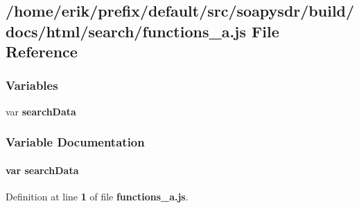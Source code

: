 \subsection{/home/erik/prefix/default/src/soapysdr/build/docs/html/search/functions\+\_\+a.js File Reference}
\label{functions__a_8js}
\subsubsection*{Variables}
\begin{DoxyCompactItemize}
\item 
var {\bf search\+Data}
\end{DoxyCompactItemize}


\subsubsection{Variable Documentation}
\paragraph[{search\+Data}]{\setlength{\rightskip}{0pt plus 5cm}var search\+Data}\label{functions__a_8js_ad01a7523f103d6242ef9b0451861231e}


Definition at line {\bf 1} of file {\bf functions\+\_\+a.\+js}.

